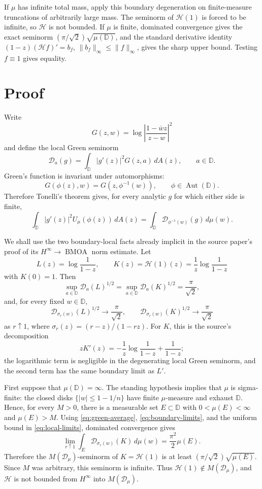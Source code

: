 \documentclass[11pt]{article}
\newcommand{\D}{\mathbb D}
\newcommand{\Aut}{\operatorname{Aut}(\D)}
\newcommand{\HH}{\mathcal H}
\newcommand{\BMOA}{\operatorname{BMOA}}
\newcommand{\dA}{\,dA}
\begin{document}
If \(\mu\) has infinite total mass, apply this boundary degeneration on
finite-measure truncations of arbitrarily large mass.  The seminorm of
\(\HH(1)\) is forced to be infinite, so \(\HH\) is not bounded.  If \(\mu\) is
finite, dominated convergence gives the exact seminorm
\((\pi/\sqrt2)\sqrt{\mu(\D)}\), and the standard derivative identity
\((1-z)(\HH f)'=b_f\), \(\|b_f\|_\infty\leq\|f\|_\infty\), gives the sharp upper
bound.  Testing \(f\equiv1\) gives equality.

\section*{Proof}

Write
\[
 G(z,w)=\log\left|\frac{1-\overline w z}{z-w}\right|^2
\]
and define the local Green seminorm
\[
 \mathcal D_a(g)=\int_{\D}|g'(z)|^2G(z,a)\dA(z),\qquad a\in\D .
\]
Green's function is invariant under automorphisms:
\[
 G(\phi(z),w)=G(z,\phi^{-1}(w)),\qquad \phi\in\Aut .
\]
Therefore Tonelli's theorem gives, for every analytic \(g\) for which either
side is finite,
\begin{equation}\label{eq:green-average}
\int_{\D}|g'(z)|^2U_\mu(\phi(z))\dA(z)
=
\int_{\D}\mathcal D_{\phi^{-1}(w)}(g)\,d\mu(w).
\end{equation}

We shall use the two boundary-local facts already implicit in the source
paper's proof of its \(H^\infty\to\BMOA\) norm estimate.  Let
\[
 L(z)=\log\frac1{1-z},\qquad
 K(z)=\HH(1)(z)=\frac1z\log\frac1{1-z}
\]
with \(K(0)=1\).  Then
\begin{equation}\label{eq:local-limits}
 \sup_{a\in\D}\mathcal D_a(L)^{1/2}
 =
 \sup_{a\in\D}\mathcal D_a(K)^{1/2}
 =
 \frac{\pi}{\sqrt2},
\end{equation}
and, for every fixed \(w\in\D\),
\begin{equation}\label{eq:boundary-limits}
 \mathcal D_{\sigma_r(w)}(L)^{1/2}\to\frac{\pi}{\sqrt2},
 \qquad
 \mathcal D_{\sigma_r(w)}(K)^{1/2}\to\frac{\pi}{\sqrt2}
\end{equation}
as \(r\uparrow1\), where \(\sigma_r(z)=(r-z)/(1-rz)\).  For \(K\), this is the
source's decomposition
\[
 zK'(z)=-\frac1z\log\frac1{1-z}+\frac1{1-z};
\]
the logarithmic term is negligible in the degenerating local Green seminorm,
and the second term has the same boundary limit as \(L'\).

First suppose that \(\mu(\D)=\infty\).  The standing hypothesis implies that
\(\mu\) is sigma-finite: the closed disks \(\{|w|\leq 1-1/n\}\) have finite
\(\mu\)-measure and exhaust \(\D\).  Hence, for every \(M>0\), there is a
measurable set \(E\subset\D\) with \(0<\mu(E)<\infty\) and \(\mu(E)>M\).
Using \eqref{eq:green-average}, \eqref{eq:boundary-limits}, and the uniform
bound in \eqref{eq:local-limits}, dominated convergence gives
\[
 \lim_{r\uparrow1}\int_E \mathcal D_{\sigma_r(w)}(K)\,d\mu(w)
 =
 \frac{\pi^2}{2}\mu(E).
\]
Therefore the \(M(\mathcal D_\mu)\)-seminorm of \(K=\HH(1)\) is at least
\((\pi/\sqrt2)\sqrt{\mu(E)}\).  Since \(M\) was arbitrary, this seminorm is
infinite.  Thus \(\HH(1)\notin M(\mathcal D_\mu)\), and \(\HH\) is not bounded
from \(H^\infty\) into \(M(\mathcal D_\mu)\).
\end{document}
